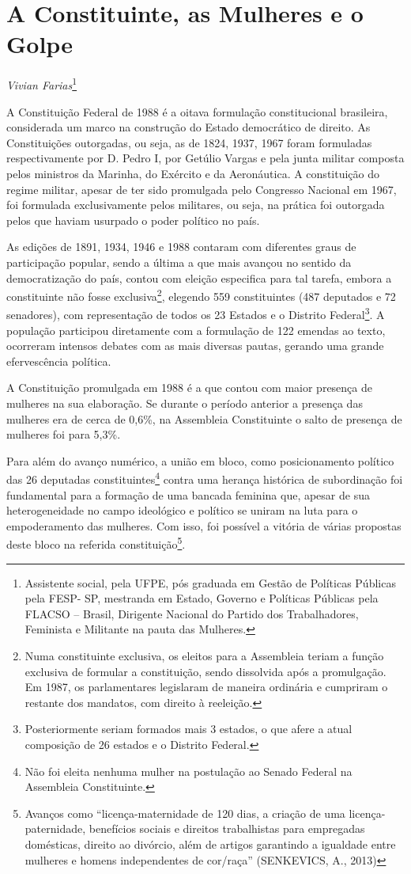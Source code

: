 \chapter{A Constituinte, as Mulheres e o Golpe}

\emph{Vivian Farias}\footnote{Assistente social, pela UFPE, pós graduada em
  Gestão de Políticas Públicas pela FESP- SP, mestranda em Estado,
  Governo e Políticas Públicas pela FLACSO -- Brasil, Dirigente Nacional
  do Partido dos Trabalhadores, Feminista e Militante na pauta das
  Mulheres.}

A Constituição Federal de 1988 é a oitava formulação constitucional
brasileira, considerada um marco na construção do Estado democrático de
direito. As Constituições outorgadas, ou seja, as de 1824, 1937, 1967
foram formuladas respectivamente por D. Pedro I, por Getúlio Vargas e
pela junta militar composta pelos ministros da Marinha, do Exército e da
Aeronáutica. A constituição do regime militar, apesar de ter sido
promulgada pelo Congresso Nacional em 1967, foi formulada exclusivamente
pelos militares, ou seja, na prática foi outorgada pelos que haviam
usurpado o poder político no país.

As edições de 1891, 1934, 1946 e 1988 contaram com diferentes graus de
participação popular, sendo a última a que mais avançou no sentido da
democratização do país, contou com eleição especifica para tal tarefa,
embora a constituinte não fosse exclusiva\footnote{Numa constituinte
  exclusiva, os eleitos para a Assembleia teriam a função exclusiva de
  formular a constituição, sendo dissolvida após a promulgação. Em 1987,
  os parlamentares legislaram de maneira ordinária e cumpriram o
  restante dos mandatos, com direito à reeleição.}, elegendo 559
constituintes (487 deputados e 72 senadores), com representação de todos
os 23 Estados e o Distrito Federal\footnote{Posteriormente seriam
  formados mais 3 estados, o que afere a atual composição de 26 estados
  e o Distrito Federal.}. A população participou diretamente com a
formulação de 122 emendas ao texto, ocorreram intensos debates com as
mais diversas pautas, gerando uma grande efervescência política.

A Constituição promulgada em 1988 é a que contou com maior presença de
mulheres na sua elaboração. Se durante o período anterior a presença das
mulheres era de cerca de 0,6\%, na Assembleia Constituinte o salto de
presença de mulheres foi para 5,3\%.

Para além do avanço numérico, a união em bloco, como posicionamento
político das 26 deputadas constituintes\footnote{Não foi eleita nenhuma
  mulher na postulação ao Senado Federal na Assembleia Constituinte.}
contra uma herança histórica de subordinação foi fundamental para a
formação de uma bancada feminina que, apesar de sua heterogeneidade no
campo ideológico e político se uniram na luta para o empoderamento das
mulheres. Com isso, foi possível a vitória de várias propostas deste
bloco na referida constituição\footnote{Avanços como
  ``licença-maternidade de 120 dias, a criação de uma
  licença-paternidade, benefícios sociais e direitos trabalhistas para
  empregadas domésticas, direito ao divórcio, além de artigos garantindo
  a igualdade entre mulheres e homens independentes de cor/raça''
  (SENKEVICS, A., 2013)}.

